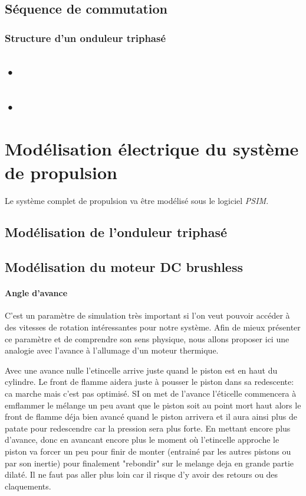 \documentclass[a4paper,12pt]{book}
\begin{document}
				 \subsection{Séquence de commutation}
				 
				  
				 \subsubsection{Structure d'un onduleur triphasé}
				 
				 \subsection{•}
				 
				 \subsection{•}
				 
		\section{Modélisation électrique du système de propulsion}
			
		Le système complet de propulsion va être modélisé sous le logiciel \textit{PSIM}.
			
			\subsection{Modélisation de l'onduleur triphasé} 
				
			\subsection{Modélisation du moteur DC brushless}
				
					\paragraph{Angle d'avance}
					C'est un paramètre de simulation très important si l'on veut pouvoir accéder à des vitesses de rotation intéressantes pour notre système. Afin de mieux présenter ce paramètre et de comprendre son sens physique, nous allons proposer ici une analogie avec l'avance à l'allumage d'un moteur thermique.
					
					Avec une avance nulle l'etincelle arrive juste quand le piston est en haut du cylindre. Le front de flamme aidera juste à pousser le piston dans sa redescente: ca marche mais c'est pas optimisé. SI on met de l'avance l'éticelle commencera à emflammer le mélange un peu avant que le piston soit au point mort haut alors le front de flamme déja bien avancé quand le piston arrivera et il aura ainsi plus de patate pour redescendre car la pression sera plus forte.
En mettant encore plus d'avance, donc en avancant encore plus le moment où l'etincelle approche le piston va forcer un peu pour finir de monter (entrainé par les autres pistons ou par son inertie) pour finalement "rebondir" sur le melange deja en grande partie dilaté. Il ne faut pas aller plus loin car il risque d'y avoir des retours ou des claquements.
\end{document}
